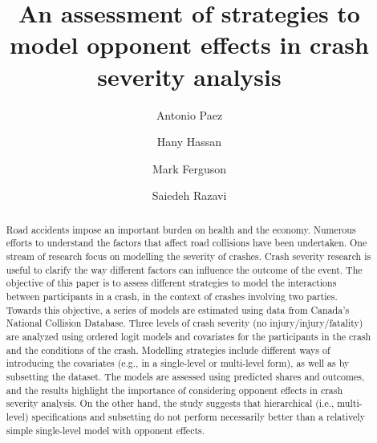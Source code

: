 \documentclass[]{elsarticle} %
\begin{document}
\begin{frontmatter}

  \title{An assessment of strategies to model opponent effects in crash severity
analysis}
    \author[]{Antonio Paez}
    \author[Louisiana State University]{Hany Hassan}
  
    \author[McMaster University]{Mark Ferguson}
  
    \author[McMaster University]{Saiedeh Razavi}
  
      \address[McMaster University]{McMaster Institute for Transportation and Logistics, 1280 Main Street
West, Hamilton, Ontario, Canada L8S 4K1}
    \address[Louisiana State University]{Department of Civil and Environmental Engineering, Baton Rouge,
Louisiana, USA 70803}
  
  \begin{abstract}
  Road accidents impose an important burden on health and the economy.
  Numerous efforts to understand the factors that affect road collisions
  have been undertaken. One stream of research focus on modelling the
  severity of crashes. Crash severity research is useful to clarify the
  way different factors can influence the outcome of the event. The
  objective of this paper is to assess different strategies to model the
  interactions between participants in a crash, in the context of crashes
  involving two parties. Towards this objective, a series of models are
  estimated using data from Canada's National Collision Database. Three
  levels of crash severity (no injury/injury/fatality) are analyzed using
  ordered logit models and covariates for the participants in the crash
  and the conditions of the crash. Modelling strategies include different
  ways of introducing the covariates (e.g., in a single-level or
  multi-level form), as well as by subsetting the dataset. The models are
  assessed using predicted shares and outcomes, and the results highlight
  the importance of considering opponent effects in crash severity
  analysis. On the other hand, the study suggests that hierarchical (i.e.,
  multi-level) specifications and subsetting do not perform necessarily
  better than a relatively simple single-level model with opponent
  effects.
  \end{abstract}
  
 \end{frontmatter}
\end{document}
